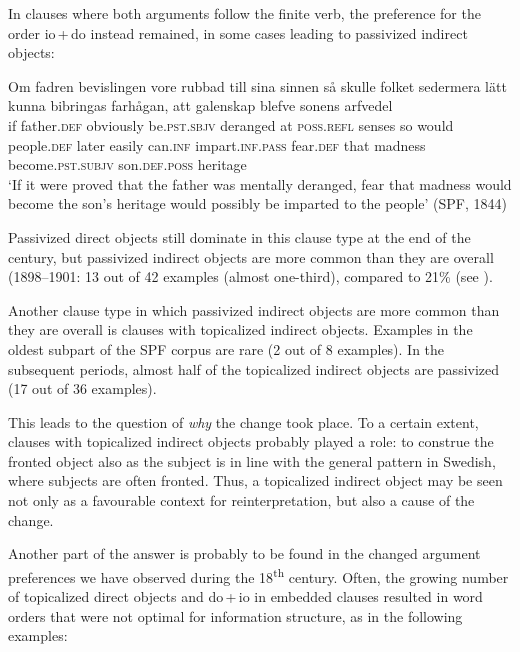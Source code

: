 \documentclass[output=paper]{langscibook}
\begin{document}
In clauses where both arguments follow the finite verb, the preference for the order io\,+\,do instead remained, in some cases leading to passivized indirect objects:

\ea%
    \label{ex:falk:25}
\gll Om  fadren    bevislingen    vore            rubbad    till    sina      sinnen  så skulle folket      sedermera  lätt      kunna    bibringas    farhågan,  att galenskap blefve              sonens          arfvedel\\
    if    father\textsc{.def}  obviously      be.\textsc{pst.sbjv}    deranged  at    \textsc{poss}.\textsc{refl}  senses  so         would people.\textsc{def}   later        easily    can.\textsc{inf}    impart.\textsc{inf.pass}  fear.\textsc{def}    that         madness   become.\textsc{pst.subjv}  son.\textsc{def.poss}  heritage  \\
\glt ‘If it were proved that the father was mentally deranged, fear that madness would become the son’s heritage would possibly be imparted to the people’ (SPF, 1844)
\z



Passivized direct objects still dominate in this clause type at the end of the century, but passivized indirect objects are more common than they are overall (1898–1901: 13 out of 42 examples (almost one-third), compared to 21\% (see ).


Another clause type in which passivized indirect objects are more common than they are overall is clauses with topicalized indirect objects. Examples in the oldest subpart of the SPF corpus are rare (2 out of 8 examples). In the subsequent periods, almost half of the topicalized indirect objects are passivized (17 out of 36 examples).



This leads to the question of \textit{why} the change took place. To a certain extent, clauses with topicalized indirect objects probably played a role: to construe the fronted object also as the subject is in line with the general pattern in Swedish, where subjects are often fronted. Thus, a topicalized indirect object may be seen not only as a favourable context for reinterpretation, but also a cause of the change.



Another part of the answer is probably to be found in the changed argument preferences we have observed during the 18\textsuperscript{th} century. Often, the growing number of topicalized direct objects and do\,+\,io in embedded clauses resulted in word orders that were not optimal for information structure, as in the following examples:
\end{document}

